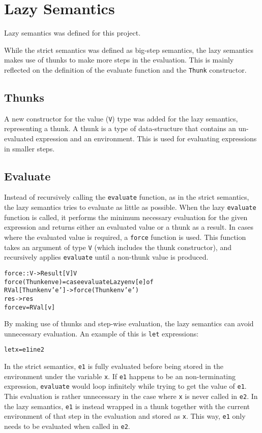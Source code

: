 \section{Lazy Semantics}
\label{LazySem}
Lazy semantics was defined for this project.

While the strict semantics was defined as big-step semantics, the lazy semantics
makes use of thunks to make more steps in the evaluation.
This is mainly reflected on the definition of the evaluate function
and the \texttt{Thunk} constructor.

\subsection{Thunks}
A new constructor for the value (\texttt{V}) type was added for the lazy semantics, representing
a thunk. A thunk is a type of data-structure that contains an un-evaluated expression
and an environment\cite{Takano:2015:TRL:2695664.2695693}. This is used for evaluating
expressions in smaller steps.

\subsection{Evaluate}
\label{Eval}
Instead of recursively calling the \texttt{evaluate} function, as
in the strict semantics, the lazy semantics tries to evaluate as little as possible.
When the lazy \texttt{evaluate} function is called, it performs the minimum necessary evaluation
for the given expression and returns either an evaluated value or a thunk as a result.
In cases where the evaluated value is required, a \texttt{force} function is used.
This function takes an argument of type \texttt{V} (which includes the thunk constructor),
and recursively applies \texttt{evaluate} until a non-thunk value is produced.

\vspace{\fboxsep}
\begin{minipage}{\linewidth}
\begin{alltt}
force :: V -> Result [V] V
force (Thunk env e) = case evaluateLazy env [e] of
  RVal [Thunk env' e'] -> force (Thunk env' e')
  res -> res
force v = RVal [v]
\end{alltt}
\end{minipage}
\vspace{\fboxsep}

By making use of thunks and step-wise evaluation, the lazy semantics can avoid unnecessary
evaluation. An example of this is \texttt{let} expressions:
\begin{alltt}
  let x = e1 in e2
\end{alltt}
In the strict semantics, \texttt{e1} is fully evaluated before being stored in the
environment under the variable \texttt{x}. If \texttt{e1} happens to be an non-terminating
expression, \texttt{evaluate} would loop infinitely while trying to get the value of \texttt{e1}.
This evaluation is rather unnecessary in the case where \texttt{x} is never called in
\texttt{e2}. In the lazy semantics, \texttt{e1} is instead wrapped in a thunk together with
the current environment of that step in the evaluation and stored as \texttt{x}. This way,
\texttt{e1} only needs to be evaluated when called in \texttt{e2}.

